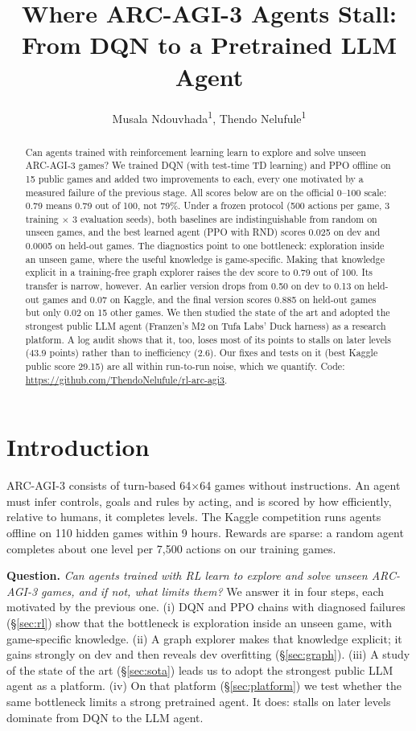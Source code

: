 \documentclass[10pt]{article}
\title{Where ARC-AGI-3 Agents Stall: From DQN to a Pretrained LLM Agent}
\author{Musala Ndouvhada\textsuperscript{1}, Thendo Nelufule\textsuperscript{1}}
\begin{document}
\maketitle

\begin{abstract}
Can agents trained with reinforcement learning learn to explore and solve unseen ARC-AGI-3 games? We trained DQN (with test-time TD learning) and PPO offline on 15 public games and added two improvements to each, every one motivated by a measured failure of the previous stage. All scores below are on the official 0--100 scale: 0.79 means 0.79 out of 100, not 79\%. Under a frozen protocol (500 actions per game, 3 training $\times$ 3 evaluation seeds), both baselines are indistinguishable from random on unseen games, and the best learned agent (PPO with RND) scores 0.025 on dev and 0.0005 on held-out games. The diagnostics point to one bottleneck: exploration inside an unseen game, where the useful knowledge is game-specific. Making that knowledge explicit in a training-free graph explorer raises the dev score to 0.79 out of 100. Its transfer is narrow, however. An earlier version drops from 0.50 on dev to 0.13 on held-out games and 0.07 on Kaggle, and the final version scores 0.885 on held-out games but only 0.02 on 15 other games. We then studied the state of the art and adopted the strongest public LLM agent (Franzen's M2 on Tufa Labs' Duck harness) as a research platform. A log audit shows that it, too, loses most of its points to stalls on later levels (43.9 points) rather than to inefficiency (2.6). Our fixes and tests on it (best Kaggle public score 29.15) are all within run-to-run noise, which we quantify. Code: \url{https://github.com/ThendoNelufule/rl-arc-agi3}.
\end{abstract}

\section{Introduction}
ARC-AGI-3 \citep{arcagi3,chollet2019} consists of turn-based 64$\times$64 games without instructions. An agent must infer controls, goals and rules by acting, and is scored by how efficiently, relative to humans, it completes levels. The Kaggle competition \citep{kaggle2026} runs agents offline on 110 hidden games within 9 hours. Rewards are sparse: a random agent completes about one level per 7{,}500 actions on our training games.

\textbf{Question.} \emph{Can agents trained with RL learn to explore and solve unseen ARC-AGI-3 games, and if not, what limits them?} We answer it in four steps, each motivated by the previous one. (i) DQN and PPO chains with diagnosed failures (\S\ref{sec:rl}) show that the bottleneck is exploration inside an unseen game, with game-specific knowledge. (ii) A graph explorer makes that knowledge explicit; it gains strongly on dev and then reveals dev overfitting (\S\ref{sec:graph}). (iii) A study of the state of the art (\S\ref{sec:sota}) leads us to adopt the strongest public LLM agent as a platform. (iv) On that platform (\S\ref{sec:platform}) we test whether the same bottleneck limits a strong pretrained agent. It does: stalls on later levels dominate from DQN to the LLM agent.
\end{document}
